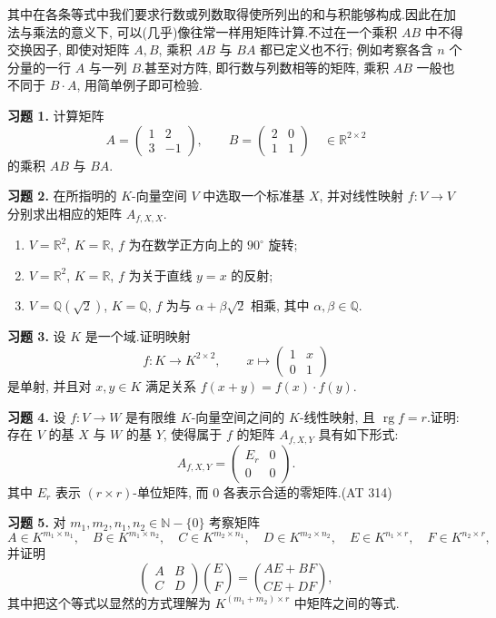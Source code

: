 其中在各条等式中我们要求行数或列数取得使所列出的和与积能够构成.因此在加法与乘法的意义下, 可以(几乎)像往常一样用矩阵计算.不过在一个乘积 $AB$ 中不得交换因子, 即使对矩阵 $A, B$, 乘积 $AB$ 与 $BA$ 都已定义也不行; 例如考察各含 $n$ 个分量的一行 $A$ 与一列 $B$.甚至对方阵, 即行数与列数相等的矩阵, 乘积 $AB$ 一般也不同于 $B \cdot A$, 用简单例子即可检验.

\aufgaben

\noindent\textbf{习题 1.} 计算矩阵
\[
A = \begin{pmatrix} 1 & 2 \\ 3 & -1 \end{pmatrix}, \qquad
B = \begin{pmatrix} 2 & 0 \\ 1 & 1 \end{pmatrix} \quad \in \mathbb{R}^{2 \times 2}
\]
的乘积 $AB$ 与 $BA$.

\noindent\textbf{习题 2.} 在所指明的 $K$-向量空间 $V$ 中选取一个标准基 $X$, 并对线性映射 $f \colon V \longrightarrow V$ 分别求出相应的矩阵 $A_{f, X, X}$.
\begin{enumerate}
\item[(i)] $V = \mathbb{R}^2$, $K = \mathbb{R}$, $f$ 为在数学正方向上的 $90^\circ$ 旋转;
\item[(ii)] $V = \mathbb{R}^2$, $K = \mathbb{R}$, $f$ 为关于直线 $y = x$ 的反射;
\item[(iii)] $V = \mathbb{Q}(\sqrt{2})$, $K = \mathbb{Q}$, $f$ 为与 $\alpha + \beta\sqrt{2}$ 相乘, 其中 $\alpha, \beta \in \mathbb{Q}$.
\end{enumerate}

\noindent\textbf{习题 3.} 设 $K$ 是一个域.证明映射
\[
f \colon K \longrightarrow K^{2 \times 2}, \qquad x \longmapsto \begin{pmatrix} 1 & x \\ 0 & 1 \end{pmatrix}
\]
是单射, 并且对 $x, y \in K$ 满足关系 $f(x + y) = f(x) \cdot f(y)$.

\noindent\textbf{习题 4.} 设 $f \colon V \longrightarrow W$ 是有限维 $K$-向量空间之间的 $K$-线性映射, 且 $\operatorname{rg} f = r$.证明: 存在 $V$ 的基 $X$ 与 $W$ 的基 $Y$, 使得属于 $f$ 的矩阵 $A_{f, X, Y}$ 具有如下形式:
\[
A_{f, X, Y} = \begin{pmatrix} E_r & 0 \\ 0 & 0 \end{pmatrix}\text{.}
\]
其中 $E_r$ 表示 $(r \times r)$-单位矩阵, 而 $0$ 各表示合适的零矩阵.(AT 314)

\noindent\textbf{习题 5.} 对 $m_1, m_2, n_1, n_2 \in \mathbb{N} - \{0\}$ 考察矩阵
\[
A \in K^{m_1 \times n_1}, \quad B \in K^{m_1 \times n_2}, \quad C \in K^{m_2 \times n_1}, \quad D \in K^{m_2 \times n_2}, \quad E \in K^{n_1 \times r}, \quad F \in K^{n_2 \times r},
\]
并证明
\[
\begin{pmatrix} A & B \\ C & D \end{pmatrix}
\binom{E}{F} = \binom{AE + BF}{CE + DF},
\]
其中把这个等式以显然的方式理解为 $K^{(m_1 + m_2) \times r}$ 中矩阵之间的等式.

